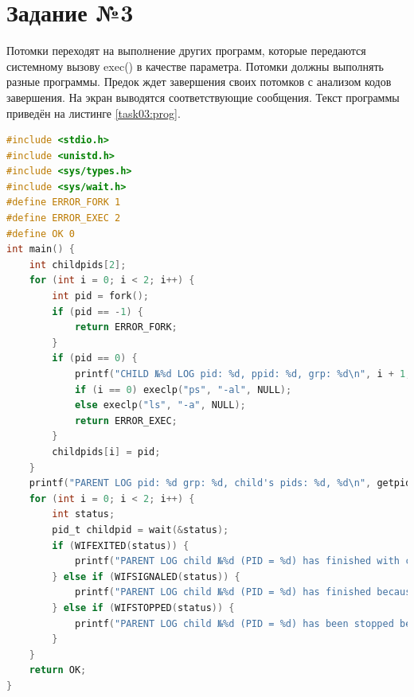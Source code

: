 \documentclass[12pt]{report}
\begin{document}
\newpage
\section*{Задание №3}

Потомки переходят на выполнение других программ, которые передаются системному вызову exec() в качестве параметра. Потомки должны выполнять разные программы. Предок ждет завершения своих потомков с анализом кодов завершения. На экран выводятся соответствующие сообщения. Текст программы приведён на листинге \ref{task03:prog}.

\begin{lstlisting}[label=task03:prog,caption=Системный вызов exec(),language=C]
#include <stdio.h>
#include <unistd.h>
#include <sys/types.h>
#include <sys/wait.h>
#define ERROR_FORK 1
#define ERROR_EXEC 2
#define OK 0
int main() {
    int childpids[2];
    for (int i = 0; i < 2; i++) {
        int pid = fork();
        if (pid == -1) {
            return ERROR_FORK;
        }
        if (pid == 0) {
            printf("CHILD №%d LOG pid: %d, ppid: %d, grp: %d\n", i + 1, getpid(), getppid(), getpgrp());
            if (i == 0) execlp("ps", "-al", NULL);
            else execlp("ls", "-a", NULL);
            return ERROR_EXEC;
        }
        childpids[i] = pid;
    }
    printf("PARENT LOG pid: %d grp: %d, child's pids: %d, %d\n", getpid(), getpgrp(), childpids[0], childpids[1]);
    for (int i = 0; i < 2; i++) {
        int status;
        pid_t childpid = wait(&status);
        if (WIFEXITED(status)) {
            printf("PARENT LOG child №%d (PID = %d) has finished with code: %d\n", i + 1, childpid, WEXITSTATUS(status));
        } else if (WIFSIGNALED(status)) {
            printf("PARENT LOG child №%d (PID = %d) has finished because of signal: %d\n", i + 1, childpid, WTERMSIG(status));
        } else if (WIFSTOPPED(status)) {
            printf("PARENT LOG child №%d (PID = %d) has been stopped because of signal: %d\n", i + 1, childpid, WSTOPSIG(status));
        }
    }
    return OK;
}
\end{lstlisting}
\end{document}
